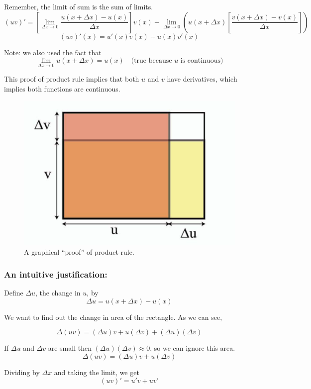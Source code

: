 Remember, the limit of sum is the sum of limits.
$$
(uv)' = \left[ \lim_{\Delta x \to 0} \frac{u(x+\Delta x) - u(x)}{\Delta x} \right] v(x) +
	\lim_{\Delta x \to 0} \left( u(x+\Delta x) \left[ \frac{v(x+\Delta x) - v(x)}{\Delta x} \right] \right)
$$
$$(uv)'(x) = u'(x)v(x) + u(x)v'(x)$$

Note: we also used the fact that $$ \lim_{\Delta x \to 0} u(x+\Delta x) = u(x) \quad \text{(true because $u$ is continuous)}$$

This proof of product rule implies that both $u$ and $v$ have derivatives, which implies both functions are continuous.

\begin{figure}[ht!]
	\centering
	\includegraphics[scale=0.4]{./images/lecture_3_figure_1.png}
	\caption{A graphical ``proof'' of product rule.}
\end{figure}

\subsubsection*{An intuitive justification:}

Define $\Delta u$, the change in $u$, by $$\Delta u = u(x+\Delta x) - u(x)$$

We want to find out the change in area of the rectangle. As we can see,

$$\Delta(uv) = (\Delta u)v + u(\Delta v) + (\Delta u)(\Delta v)$$

If $\Delta u$ and $\Delta v$ are small then $(\Delta u)(\Delta v) \approx 0$, so we can ignore this area.
$$\Delta(uv) = (\Delta u)v + u(\Delta v)$$

Dividing by $\Delta x$ and taking the limit, we get
$$(uv)' = u'v + uv'$$

